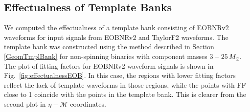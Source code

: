 \documentclass{article}
\newcommand{\red}[1]{{\color{red}{#1}\xspace}}
\begin{document}
\subsection{Effectualness of Template Banks}

We computed the effectualness of a template bank consisting of EOBNRv2 waveforms for input signals from EOBNRv2 and TaylorF2 waveforms.
The template bank was constructed using the method described in Section \ref{GeomTmplBank} for non-spinning binaries with component masses $3$ -- $25\,M_{\odot}$. The plot of fitting factors for EOBNRv2 waveform signals is shown in Fig.~\ref{fig:effectualnessEOB}.
In this case, the regions with lower fitting factors reflect
the lack of template waveforms in those regions, while the points with
FF close to 1 coincide with the points in the template bank. This
is clearer from the second plot in $\eta-\mathcal{M}$ coordinates.
\red{Define $\mathcal{M}$}
\end{document}
